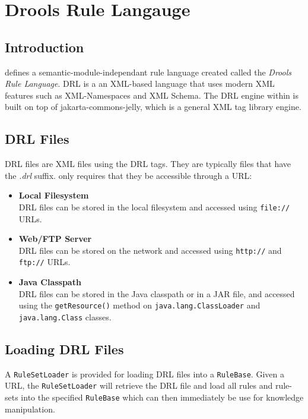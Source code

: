 \chapter{Drools Rule Langauge}

\section{Introduction}

\drools{} defines a semantic-module-independant rule language created 
called the \emph{Drools Rule Language}.  DRL is a an XML-based
language that uses modern XML features such as XML-Namespaces and XML
Schema. The DRL engine within \drools{} is built on top of
jakarta-commons-jelly, which is a general XML tag library
engine. 

\section{DRL Files}

DRL files are XML files using the DRL tags. They are typically files
that have the \emph{.drl} suffix.  \drools{} only requires that they
be accessible through a URL:

\begin{itemize}
	\item \textbf{\textsf{Local Filesystem}} \\
		DRL files can be stored in the local filesystem and
		accessed using \verb|file://| URLs.
	\item \textbf{\textsf{Web/FTP Server}} \\
		DRL files can be stored on the network and
		accessed using \verb|http://| and \verb|ftp://| URLs.
	\item \textbf{\textsf{Java Classpath}} \\
		DRL files can be stored in the Java classpath or in a JAR
		file, and accessed using the \verb|getResource()| method
		on \verb|java.lang.ClassLoader| and \verb|java.lang.Class|
		classes.
\end{itemize}

\section{Loading DRL Files}

A \verb|RuleSetLoader| is provided for loading DRL files into a
\verb|RuleBase|.  Given a URL, the \verb|RuleSetLoader| will retrieve
the DRL file and load all rules and rule-sets into the specified
\verb|RuleBase| which can then immediately be use for knowledge
manipulation.

